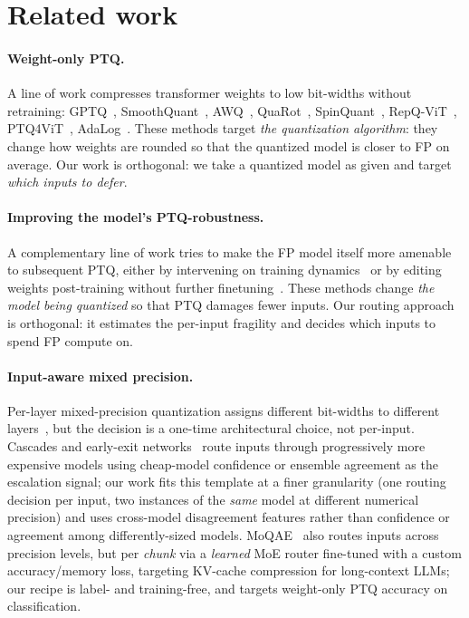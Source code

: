 \documentclass{article}
\newcommand{\fp}{\textsc{FP}\xspace}
\newcommand{\ptq}{\textsc{PTQ}\xspace}
\begin{document}
\section{Related work}

\paragraph{Weight-only \ptq.}
A line of work compresses transformer weights to low bit-widths without retraining: GPTQ~\cite{frantar2023gptq}, SmoothQuant~\cite{xiao2023smoothquant}, AWQ~\cite{lin2024awq}, QuaRot~\cite{ashkboos2024quarot}, SpinQuant~\cite{liu2024spinquant}, RepQ-ViT~\cite{li2023repqvit}, PTQ4ViT~\cite{ptq4vit}, AdaLog~\cite{adalog}.
These methods target \emph{the quantization algorithm}: they change how weights are rounded so that the quantized model is closer to \fp{} on average.
Our work is orthogonal: we take a quantized model as given and target \emph{which inputs to defer}.

\paragraph{Improving the model's PTQ-robustness.}
A complementary line of work tries to make the FP model itself more amenable to subsequent \ptq{}, either by intervening on training dynamics~\cite{catalan2025training, jacob2018quantization} or by editing weights post-training without further finetuning~\cite{solombrino2026zeroshotquantizationweightspacearithmetic}. These methods change \emph{the model being quantized} so that \ptq{} damages fewer inputs. Our routing approach is orthogonal: it estimates the per-input fragility  and decides which inputs to spend \fp{} compute on.

\paragraph{Input-aware mixed precision.}
Per-layer mixed-precision quantization assigns different bit-widths to different layers~\cite{dong2019hawq}, but the decision is a one-time architectural choice, not per-input.
Cascades and early-exit networks~\cite{teerapittayanon2016branchynet,huang2018msdnet,kolawole2024revisiting} route inputs through progressively more expensive models using cheap-model confidence or ensemble agreement as the escalation signal; our work fits this template at a finer granularity (one routing decision per input, two instances of the \emph{same} model at different numerical precision) and uses cross-model disagreement features rather than confidence or agreement among differently-sized models.
MoQAE~\cite{tao2025moqae} also routes inputs across precision levels, but per \emph{chunk} via a \emph{learned} MoE router fine-tuned with a custom accuracy/memory loss, targeting KV-cache compression for long-context LLMs; our recipe is label- and training-free, and targets weight-only \ptq{} accuracy on classification.
\end{document}
